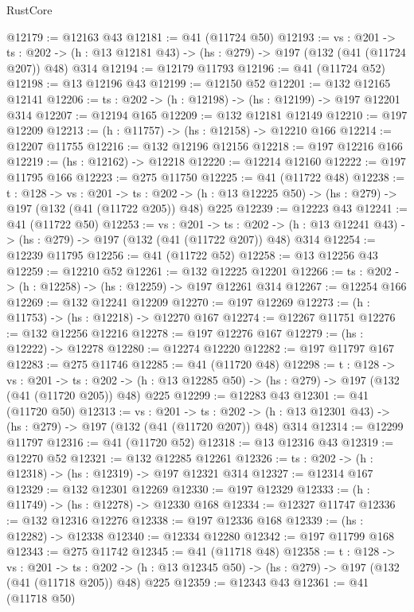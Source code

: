 \begin{lexlean}{RustCore}
\begin{coremodule}
@12179 := @12163 @43
@12181 := @41 (@11724 @50)
@12193 := {vs : @201} ->
  {ts : @202} -> (h : @13 @12181 @43) -> (hs : @279) -> @197 (@132 (@41 (@11724 @207)) @48) @314
@12194 := @12179 @11793
@12196 := @41 (@11724 @52)
@12198 := @13 @12196 @43
@12199 := @12150 @52
@12201 := @132 @12165 @12141
@12206 := {ts : @202} -> (h : @12198) -> (hs : @12199) -> @197 @12201 @314
@12207 := @12194 @165
@12209 := @132 @12181 @12149
@12210 := @197 @12209
@12213 := (h : @11757) -> (hs : @12158) -> @12210 @166
@12214 := @12207 @11755
@12216 := @132 @12196 @12156
@12218 := @197 @12216 @166
@12219 := (hs : @12162) -> @12218
@12220 := @12214 @12160
@12222 := @197 @11795 @166
@12223 := @275 @11750
@12225 := @41 (@11722 @48)
@12238 := {t : @128} ->
  {vs : @201} ->
  {ts : @202} -> (h : @13 @12225 @50) -> (hs : @279) -> @197 (@132 (@41 (@11722 @205)) @48) @225
@12239 := @12223 @43
@12241 := @41 (@11722 @50)
@12253 := {vs : @201} ->
  {ts : @202} -> (h : @13 @12241 @43) -> (hs : @279) -> @197 (@132 (@41 (@11722 @207)) @48) @314
@12254 := @12239 @11795
@12256 := @41 (@11722 @52)
@12258 := @13 @12256 @43
@12259 := @12210 @52
@12261 := @132 @12225 @12201
@12266 := {ts : @202} -> (h : @12258) -> (hs : @12259) -> @197 @12261 @314
@12267 := @12254 @166
@12269 := @132 @12241 @12209
@12270 := @197 @12269
@12273 := (h : @11753) -> (hs : @12218) -> @12270 @167
@12274 := @12267 @11751
@12276 := @132 @12256 @12216
@12278 := @197 @12276 @167
@12279 := (hs : @12222) -> @12278
@12280 := @12274 @12220
@12282 := @197 @11797 @167
@12283 := @275 @11746
@12285 := @41 (@11720 @48)
@12298 := {t : @128} ->
  {vs : @201} ->
  {ts : @202} -> (h : @13 @12285 @50) -> (hs : @279) -> @197 (@132 (@41 (@11720 @205)) @48) @225
@12299 := @12283 @43
@12301 := @41 (@11720 @50)
@12313 := {vs : @201} ->
  {ts : @202} -> (h : @13 @12301 @43) -> (hs : @279) -> @197 (@132 (@41 (@11720 @207)) @48) @314
@12314 := @12299 @11797
@12316 := @41 (@11720 @52)
@12318 := @13 @12316 @43
@12319 := @12270 @52
@12321 := @132 @12285 @12261
@12326 := {ts : @202} -> (h : @12318) -> (hs : @12319) -> @197 @12321 @314
@12327 := @12314 @167
@12329 := @132 @12301 @12269
@12330 := @197 @12329
@12333 := (h : @11749) -> (hs : @12278) -> @12330 @168
@12334 := @12327 @11747
@12336 := @132 @12316 @12276
@12338 := @197 @12336 @168
@12339 := (hs : @12282) -> @12338
@12340 := @12334 @12280
@12342 := @197 @11799 @168
@12343 := @275 @11742
@12345 := @41 (@11718 @48)
@12358 := {t : @128} ->
  {vs : @201} ->
  {ts : @202} -> (h : @13 @12345 @50) -> (hs : @279) -> @197 (@132 (@41 (@11718 @205)) @48) @225
@12359 := @12343 @43
@12361 := @41 (@11718 @50)

\end{coremodule}
\end{lexlean}

